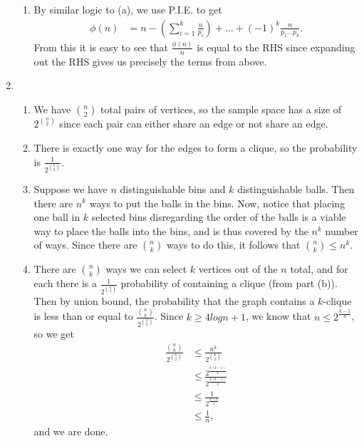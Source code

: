 \begin{enumerate}
\begin{enumerate}
        \item By similar logic to (a), we use P.I.E. to get
        \begin{align*}
            \phi(n) &= n - (\sum\limits_{i = 1}^k \frac{n}{p_i}) + \dots + (-1)^k\frac{n}{p_1 \dots p_k}.
        \end{align*}
        From this it is easy to see that $\frac{\phi(n)}{n}$ is equal to the RHS since expanding out the RHS gives us precisely the terms from above.
    \end{enumerate}
    
    \item \begin{enumerate}
        \item We have $\binom{n}{2}$ total pairs of vertices, so the sample space has a size of $2^{\binom{n}{2}}$ since each pair can either share an edge or not share an edge.
        
        \item There is exactly one way for the edges to form a clique, so the probability is $\frac{1}{2^{\binom{k}{2}}}$.
        
        \item Suppose we have $n$ distinguishable bins and $k$ distinguishable balls. Then there are $n^k$ ways to put the balls in the bins. Now, notice that placing one ball in $k$ selected bins disregarding the order of the balls is a viable way to place the balls into the bins, and is thus covered by the $n^k$ number of ways. Since there are $\binom{n}{k}$ ways to do this, it follows that $\binom{n}{k} \leq n^k$.
        
        \item There are $\binom{n}{k}$ ways we can select $k$ vertices out of the $n$ total, and for each there is a $\frac{1}{2^{\binom{k}{2}}}$ probability of containing a clique (from part (b)). Then by union bound, the probability that the graph contains a $k$-clique is less than or equal to $\frac{\binom{n}{k}}{2^{\binom{k}{2}}}$. Since $k \geq 4logn + 1$, we know that $n \leq 2^{\frac{k-1}{4}}$, so we get
        \begin{align*}
            \frac{\binom{n}{k}}{2^{\binom{k}{2}}} &\leq \frac{n^k}{2^{\binom{k}{2}}} \\
            &\leq \frac{2^{\frac{k(k-1)}{4}}}{2^{\frac{k(k-1)}{2}}} \\
            &\leq \frac{1}{2^{\frac{k-1}{4}}} \\
            &\leq \frac{1}{n},
        \end{align*}
        and we are done.
    \end{enumerate}
    

\end{enumerate}

